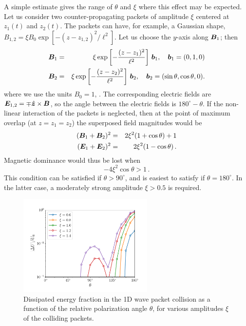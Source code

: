 A simple estimate gives the range of $\theta$ and $\xi$ where this effect may be expected.  Let us consider two counter-propagating packets of amplitude $\xi$ centered at $z_1(t)$ and $z_2(t)$. The packets can have, for example, a Gaussian shape, $B_{1,2}=\xi B_0\exp[-(z-z_{1,2})^2/\ell^2]$. Let us choose the $y$-axis along $\boldsymbol{B}_1$; then
%
\begin{eqnarray}
   \boldsymbol{B}_1&=&\xi \exp\left[-\frac{(z-z_1)^2}{\ell^2}\right]\,\boldsymbol{b}_1, \quad 
       \boldsymbol{b}_1=(0,1,0) \\
   \boldsymbol{B}_2&=&\xi \exp\left[-\frac{(z-z_2)^2}{\ell^2}\right]\,\boldsymbol{b}_2, \quad 
       \boldsymbol{b}_2=(\sin\theta,\cos\theta,0).
\end{eqnarray}
%
where we use the units $B_0=1$, . The corresponding electric fields are $\boldsymbol{E}_{1,2}=\mp \hat{\boldsymbol{z}} \times \boldsymbol{B}$,
so the angle between the electric fields is $180^\circ - \theta$.
%
If the non-linear interaction of the packets is neglected, then at the point of maximum overlap (at $z=z_1=z_2$) the superposed field magnitudes would be
%
\begin{eqnarray}
	(\boldsymbol{B}_1+\boldsymbol{B}_2)^2 &=& 2\xi^2(1+\cos\theta) + 1 \\ \nonumber
	(\boldsymbol{E}_1+\boldsymbol{E}_2)^2 &=& 2\xi^2(1-\cos\theta) \, .
\end{eqnarray}
%
Magnetic dominance would thus be lost when
%
\begin{equation}\label{cr1}
	-4\xi^2\cos\theta >1 \, .
\end{equation}
%
This condition can be satisfied if $\theta>90^\circ$, and is easiest to satisfy if $\theta=180^{\circ}$. In the latter case, a moderately strong amplitude $\xi>0.5$ is required.
%
\begin{figure}[h]
\centering
\includegraphics[width=0.6\textwidth]{pics/chap4/dis1D}
\caption[Dissipated energy fraction in the 1D wave packet collision as a function of the relative polarization angle $\theta$]{Dissipated energy fraction in the 1D wave packet collision as a function of the relative polarization angle $\theta$, for various amplitudes $\xi$ of the colliding packets.}
\label{dis1d}
\end{figure}
